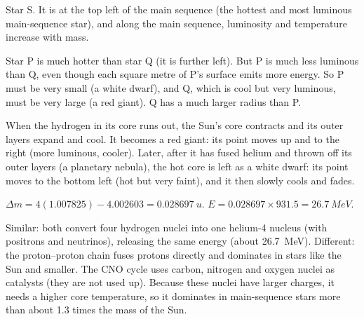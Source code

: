 \documentclass[12pt]{article}
\begin{document}
\ansq
{}
\begin{crit}
\end{crit}
\sample
Star S. It is at the top left of the main sequence (the hottest and most luminous main-sequence star), and
along the main sequence, luminosity and temperature increase with mass.
\begin{crit}
\end{crit}
\sample
Star P is much hotter than star Q (it is further left). But P is much less luminous than Q, even though
each square metre of P's surface emits more energy. So P must be very small (a white dwarf), and Q, which
is cool but very luminous, must be very large (a red giant). Q has a much larger radius than P.
\begin{crit}
\end{crit}
\sample
When the hydrogen in its core runs out, the Sun's core contracts and its outer layers expand and cool. It
becomes a red giant: its point moves up and to the right (more luminous, cooler). Later, after it has
fused helium and thrown off its outer layers (a planetary nebula), the hot core is left as a white dwarf:
its point moves to the bottom left (hot but very faint), and it then slowly cools and fades.

\ansq
{}
\begin{crit}
\end{crit}
\sample
$\Delta m = 4(1.007825) - 4.002603 = \qty{0.028697}{u}$. \quad
$E = 0.028697 \times 931.5 = \qty{26.7}{MeV}$.
\begin{crit}
\end{crit}
\sample
Similar: both convert four hydrogen nuclei into one helium-4 nucleus (with positrons and neutrinos),
releasing the same energy (about \qty{26.7}{MeV}). Different: the proton--proton chain fuses protons
directly and dominates in stars like the Sun and smaller. The CNO cycle uses carbon, nitrogen and oxygen
nuclei as catalysts (they are not used up). Because these nuclei have larger charges, it needs a higher
core temperature, so it dominates in main-sequence stars more than about 1.3 times the mass of the Sun.
\end{document}
